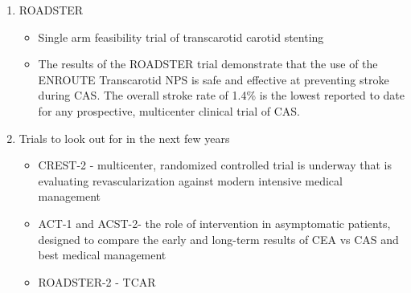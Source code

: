 \documentclass[
]{book}
\providecommand{\tightlist}{%
  \setlength{\itemsep}{0pt}\setlength{\parskip}{0pt}}
\begin{document}
\begin{enumerate}
  \begin{itemize}
  \item
    Compared CEA vs.~CAS in both symptomatic and asymptomatic
    patients.
  \item
    Composite endpoint of 30-day stroke, MI, death equivalent
    between CEA and CAS
  \item
    CAS had a significantly higher incidence of stroke and death
    than CEA and CEA higher incidence of MI

    \begin{itemize}
    \tightlist
    \item
      Follow up at 10 years demonstrated no difference in
      composite stroke/MI/death but increased rate of stroke/death
      in stented patients likely attributable to increased
      periprocedural stroke. \citep{brottLongTermResultsStenting2016b}
    \end{itemize}
  \item
    Subanalyses identified that older patients (\textgreater70y) had better
    outcomes after CEA than CAS, the QOL impact of stroke was more
    significant than that of MI, and anatomic characteristics of
    carotid lesions (longer, sequential, remote) were predictive of
    increased stroke and death after CAS
  \item
    Unfortunately, this study provides a benchmark to strive for,
    but no other large trials have achieved these results.
  \end{itemize}
\item
  ROADSTER

  \begin{itemize}
  \item
    Single arm feasibility trial of transcarotid carotid stenting
  \item
    The results of the ROADSTER trial demonstrate that the use of
    the ENROUTE Transcarotid NPS is safe and effective at preventing
    stroke during CAS. The overall stroke rate of 1.4\% is the lowest
    reported to date for any prospective, multicenter clinical trial
    of CAS.
  \end{itemize}
\item
  Trials to look out for in the next few years

  \begin{itemize}
  \item
    CREST-2 - multicenter, randomized controlled trial is underway
    that is evaluating revascularization against modern intensive
    medical management
  \item
    ACT-1 and ACST-2- the role of intervention in asymptomatic
    patients, designed to compare the early and long-term results of
    CEA vs CAS and best medical management
  \item
    ROADSTER-2 - TCAR
  \end{itemize}
\end{enumerate}
\end{document}
